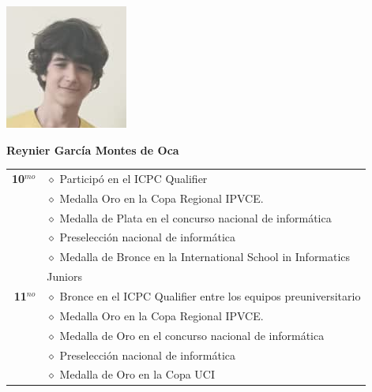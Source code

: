 \begin{minipage}{0.2\textwidth}
	\includegraphics[width=\linewidth]{img/concursantes/reynier.png} %
\end{minipage}
\hfill
\begin{minipage}{0.7\textwidth}
	\textbf{Reynier García Montes de Oca}
	
	\vspace*{0.1in}
	\begin{tabular}{rl}
		
		\textbf{10$^{mo}$} 
		& $\diamond$ Participó en el ICPC Qualifier \\
		& $\diamond$ Medalla Oro en la Copa Regional IPVCE. \\
		& $\diamond$ Medalla de Plata en el concurso nacional de informática\\
		& $\diamond$ Preselección nacional de informática  \\
		& $\diamond$ Medalla de Bronce en la International School in Informatics\\
		& Juniors \\
		
		\textbf{11$^{no}$} 
		& $\diamond$ Bronce en el ICPC Qualifier entre los equipos preuniversitario  \\
		& $\diamond$ Medalla Oro en la Copa Regional IPVCE. \\
		& $\diamond$ Medalla de Oro en el concurso nacional de informática\\
		& $\diamond$ Preselección nacional de informática  \\
		& $\diamond$ Medalla de Oro en la Copa UCI \\
		
	
		
		
	\end{tabular}
\end{minipage}

